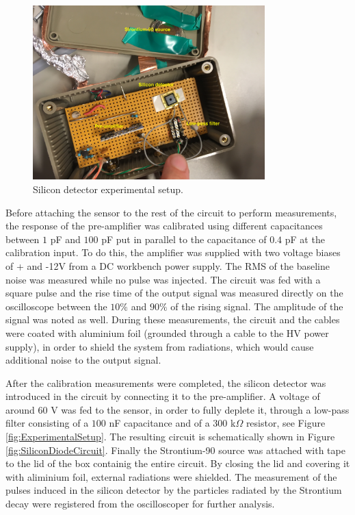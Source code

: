 \documentclass[12pt]{article}
\begin{document}
\begin{figure}[htb]
  \centering
  \includegraphics[width=0.8\textwidth]{./graphics/experimentalSetup}
  \caption{Silicon detector experimental setup.}
  \label{fig:ExperimentalSetpu}
\end{figure}

Before attaching the sensor to the rest of the circuit to perform measurements, the response of the pre-amplifier was calibrated using different capacitances between $1$ pF and $100$ pF put in parallel to the capacitance of $0.4$ pF at the calibration input. To do this, the amplifier was supplied with two voltage biases of + and -12V from a DC workbench power supply. The RMS of the baseline noise was measured while no pulse was injected. The circuit was fed with a square pulse and the rise time of the output signal was measured directly on the oscilloscope between the $10\%$ and $90\%$ of the rising signal. The amplitude of the signal was noted as well. During these measurements, the circuit and the cables were coated with aluminium foil (grounded through a cable to the HV power supply), in order to shield the system from radiations, which would cause additional noise to the output signal.

After the calibration measurements were completed, the silicon detector was introduced in the circuit by connecting it to the pre-amplifier. A voltage of around $60$ V was fed to the sensor, in order to fully deplete it, through a low-pass filter consisting of a $100$ nF capacitance and of a $300$ k$\Omega$ resistor, see Figure \ref{fig:ExperimentalSetup}. The resulting circuit is schematically shown in Figure \ref{fig:SiliconDiodeCircuit}.
Finally the Strontium-90 source was attached with tape to the lid of the box containig the entire circuit. By closing the lid and covering it with aliminium foil, external radiations were shielded. The measurement of the pulses induced in the silicon detector by the particles radiated by the Strontium decay were registered from the oscilloscoper for further analysis.
\end{document}
